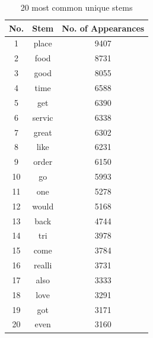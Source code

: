 \begin{table}[]
    \centering
    \caption{20 most common unique stems}
    \begin{tabular}{|c|c|c|}
        \hline
        No. & Stem & No. of Appearances  \\
        \hline
        1 & place & 9407 \\
        2 & food & 8731 \\
        3 & good & 8055 \\
        4 & time & 6588 \\
        5 & get & 6390 \\
        6 & servic & 6338 \\
        7 & great & 6302 \\
        8 & like & 6231 \\
        9 & order & 6150 \\
        10 & go & 5993 \\
        11 & one & 5278 \\
        12 & would & 5168 \\
        13 & back & 4744 \\
        14 & tri & 3978 \\
        15 & come & 3784 \\
        16 & realli & 3731 \\
        17 & also & 3333 \\
        18 & love & 3291 \\
        19 & got & 3171 \\
        20 & even & 3160\\
        \hline
    \end{tabular}
    \label{tab:most_common_stems}
\end{table}
